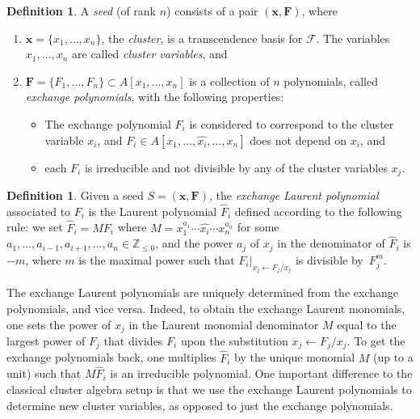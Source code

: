 \documentclass[pdftex]{sigma}
\numberwithin{equation}{section}
\theoremstyle{definition}
\newtheorem{defn}[thm]{Definition}
\begin{document}
\begin{defn}
	A \textit{seed} (of rank $n$) consists of a pair $(\bm{x}, \bm{F})$, where
	\begin{enumerate}\itemsep=0pt
		\item[(1)] $\bm{x} = \{x_1, \dots, x_n\}$, the \textit{cluster}, is a transcendence basis for $\mathcal{F}$. The variables $x_1, \dots, x_n$ are called \textit{cluster variables}, and
		\item[(2)] $\bm{F} = \{F_1, \dots, F_n\} \subset A[x_1, \dots, x_n]$ is a collection of $n$ polynomials, called \textit{exchange polynomials}, with the following properties:
		\begin{itemize}\itemsep=0pt
			\item[(LP1)] The exchange polynomial $F_i$ is considered to correspond to the cluster variable $x_i$, and $F_i\in A[x_1, \dots, \widehat{x_i}, \dots, x_n]$ does not depend on $x_i$, and
			\item[(LP2)] each $F_i$ is irreducible and not divisible by any of the cluster variables $x_j$.
		\end{itemize}
	\end{enumerate}
\end{defn}

\begin{defn}\label{def!exchange-laurent-poly}
Given a seed $S = (\bm{x}, \bm{F})$, the \textit{exchange Laurent polynomial} associated to $F_i$ is the Laurent polynomial $\hat{F}_i$ defined according to the following rule: we set $\hat{F}_i = M F_i$ where ${M = x_1^{a_1} \cdots \widehat{x_i} \cdots x_n^{a_n}}$ for some $a_1, \dots , a_{i-1}, a_{i+1}, \dots , a_n \in \mathbb{Z}_{\leq 0}$, and the power $a_j$ of $x_j$ in the denominator of $\hat{F}_i$ is $-m$, where $m$ is the maximal power such that $F_{i} |_{x_j \leftarrow F_j/x_j}$ is divisible by~$F_j^m$.
\end{defn}

The exchange Laurent polynomials are uniquely determined from the exchange polynomials, and vice versa. Indeed, to obtain the exchange Laurent monomials, one sets the power of $x_j$ in the Laurent monomial denominator $M$ equal to the largest power of $F_j$ that divides $F_i$ upon the substitution $x_j \leftarrow F_j / x_j$. To get the exchange polynomials back, one multiplies $\hat{F}_i$ by the unique monomial $M$ (up to a unit) such that $M\hat{F}_i$ is an irreducible polynomial. One important difference to the classical cluster algebra setup is that we use the exchange Laurent polynomials to determine new cluster variables, as opposed to just the exchange polynomials.
\end{document}
